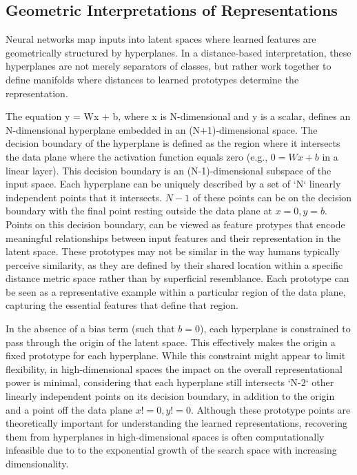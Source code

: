 \subsection{Geometric Interpretations of Representations}

Neural networks map inputs into latent spaces where learned features are geometrically structured by hyperplanes. In a distance-based interpretation, these hyperplanes are not merely separators of classes, but rather work together to define manifolds where distances to learned prototypes determine the representation. 

The equation y = Wx + b, where x is N-dimensional and y is a scalar, defines an N-dimensional hyperplane embedded in an (N+1)-dimensional space. The decision boundary of the hyperplane is defined as the region where it intersects the data plane where the activation function equals zero (e.g., $0 = Wx + b$ in a linear layer). This decision boundary is an (N-1)-dimensional subspace of the input space. Each hyperplane can be uniquely described by a set of `N` linearly independent points that it intersects. $N-1$ of these points can be on the decision boundary with the final point resting outside the data plane at ${x=0, y=b}$. Points on this decision boundary, can be viewed as feature protypes that encode meaningful relationships between input features and their representation in the latent space. These prototypes may not be similar in the way humans typically perceive similarity, as they are defined by their shared location within a specific distance metric space rather than by superficial resemblance. Each prototype can be seen as a representative example within a particular region of the data plane, capturing the essential features that define that region.

In the absence of a bias term (such that $b=0$), each hyperplane is constrained to pass through the origin of the latent space. This effectively makes the origin a fixed prototype for each hyperplane. While this constraint might appear to limit flexibility, in high-dimensional spaces the impact on the overall representational power is minimal, considering that each hyperplane still intersects `N-2` other linearly independent points on its decision boundary, in addition to the origin and a point off the data plane ${x!=0, y!=0}$. Although these prototype points are theoretically important for understanding the learned representations, recovering them from hyperplanes in high-dimensional spaces is often computationally infeasible due to to the exponential growth of the search space with increasing dimensionality.

